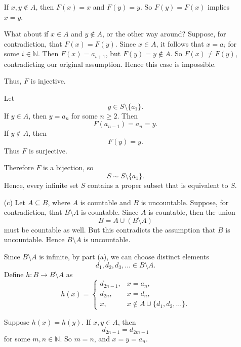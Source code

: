 \documentclass[12pt]{article}
\begin{document}
\begin{enumerate}
          If $x, y \notin A$, then $F(x) = x$ and $F(y) = y$.
          So $F(y) = F(x)$ implies $x = y$.

          What about if $x \in A$ and $y \notin A$, or the other way around?
          Suppose, for contradiction, that $F(x) = F(y)$.
          Since $x \in A $, it follows that $x = a_{i}$ for some $i \in \mathbb{N}$.
          Then $F(x) = a_{i+1}$, but $F(y) = y \notin A$.
          So $F(x) \neq F(y)$, contradicting our original assumption.
          Hence this case is impossible.

          Thus, $F$ is injective.

          Let
          \[
              y \in S \setminus \{a_1\}.
          \]
          If $y \in A$, then $y = a_n$ for some $n \geq 2$.
          Then
          \[
              F(a_{n-1}) = a_n = y.
          \]
          If $y \notin A$, then
          \[
              F(y) = y.
          \]
          Thus $F$ is surjective.

          Therefore $F$ is a bijection, so
          \[
              S \sim S \setminus \{a_1\}.
          \]
          Hence, every infinite set $S$ contains a proper subset that is equivalent to $S$.



    \item [(c)]
          Let $A \subseteq B$, where $A$ is countable and $B$ is uncountable.
          Suppose, for contradiction, that $B \setminus A$ is countable.
          Since $A$ is countable, then the union
          \[
              B = A \cup (B \setminus A)
          \]
          must be countable as well. But this contradicts the assumption that $B$ is uncountable.
          Hence $B \setminus A$ is uncountable.

          Since $B \setminus A$ is infinite, by part (a), we can choose distinct elements
          \[
              d_1, d_2, d_3, \ldots \in B \setminus A.
          \]
          Define $h: B \to B \setminus A$ as
          \[
              h(x)=
              \begin{cases}
                  d_{2n-1}, & x=a_n,                           \\
                  d_{2n},   & x=d_n,                           \\
                  x,        & x\notin A\cup\{d_1,d_2,\ldots\}.
              \end{cases}
          \]

          Suppose $h(x) = h(y)$.
          If $x, y \in A$, then
          \[
              d_{2n-1} = d_{2m-1}
          \]
          for some $m, n \in \mathbb{N}$.
          So $m = n$, and $x = y = a_n$.


\end{enumerate}
\end{document}

